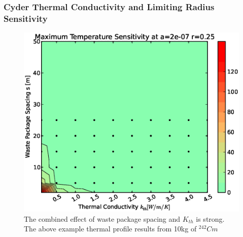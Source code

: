 \begin{frame}[ctb!]
\frametitle{Cyder Thermal Conductivity and Limiting Radius Sensitivity}

\begin{figure}[htbp!]
\begin{center}
\includegraphics[height=0.7\textheight]{./thermal_demonstration/conductivity/ks.eps}
\end{center}
\caption[$K_{th}$ vs. Waste Package Spacing Sensitivity in Cyder]{
The combined effect of waste package spacing and $K_{th}$ is strong. The above example thermal profile results from 10kg of 
$^{242}Cm$}
\label{fig:ks}
\end{figure}
\end{frame}


